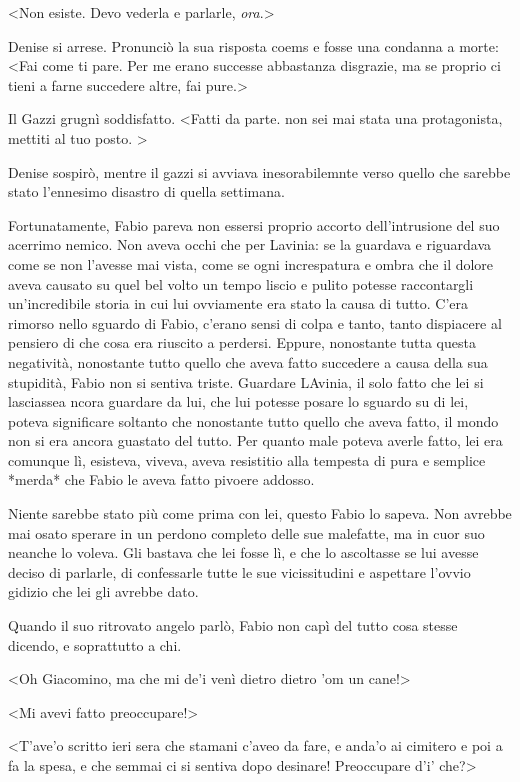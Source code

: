 <Non esiste. Devo vederla e parlarle,
\emph{ora}.>

Denise si arrese. Pronunciò la sua risposta coems e fosse una condanna a
morte: <Fai come ti pare. Per me erano successe abbastanza
disgrazie, ma se proprio ci tieni a farne succedere altre, fai
pure.>

Il Gazzi grugnì soddisfatto. <Fatti da parte. non sei mai
stata una protagonista, mettiti al tuo posto. >

Denise sospirò, mentre il gazzi si avviava inesorabilemnte verso quello
che sarebbe stato l'ennesimo disastro di quella settimana.

Fortunatamente, Fabio pareva non essersi proprio accorto dell'intrusione del suo acerrimo nemico. Non aveva occhi che per Lavinia: se la guardava e riguardava come se non l'avesse mai vista, come se ogni increspatura e ombra che il dolore aveva causato su quel bel volto un tempo liscio e pulito potesse raccontargli un'incredibile storia in cui lui ovviamente era stato la causa di tutto. C'era rimorso nello sguardo di Fabio, c'erano sensi di colpa e tanto, tanto dispiacere al pensiero di che cosa era riuscito a perdersi. Eppure, nonostante tutta questa negatività, nonostante tutto quello che aveva fatto succedere a causa della sua stupidità, Fabio non si sentiva triste. Guardare LAvinia, il solo fatto che lei si lasciassea ncora guardare da lui, che lui potesse posare lo sguardo su di lei, poteva significare soltanto che nonostante tutto quello che aveva fatto, il mondo non si era ancora guastato del tutto. Per quanto male poteva averle fatto, lei era comunque lì, esisteva, viveva, aveva resistitio alla tempesta di pura e semplice *merda* che Fabio le aveva fatto pivoere addosso.

Niente sarebbe stato più come prima con lei, questo Fabio lo sapeva. Non avrebbe mai osato sperare in un perdono completo delle sue malefatte, ma in cuor suo neanche lo voleva. Gli bastava che lei fosse lì, e che lo ascoltasse se lui avesse deciso di parlarle, di confessarle tutte le sue vicissitudini e aspettare l'ovvio gidizio che lei gli avrebbe dato.

Quando il suo ritrovato angelo parlò, Fabio non capì del tutto cosa stesse dicendo, e soprattutto a chi.

<Oh Giacomino, ma che mi de'i venì dietro dietro 'om un cane!>

<Mi avevi fatto preoccupare!>

<T'ave'o scritto ieri sera che stamani c'aveo da fare, e anda'o ai cimitero e poi a fa la spesa, e che semmai ci si sentiva dopo desinare! Preoccupare d'i' che?>

